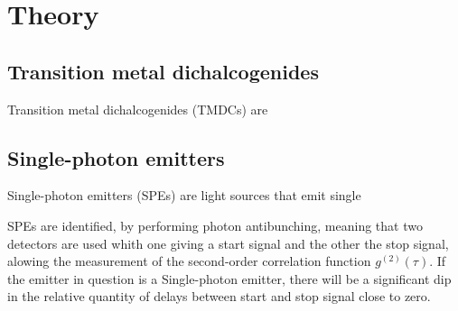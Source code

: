 \section{Theory}
\label{sec:theory}

\subsection{Transition metal dichalcogenides}

Transition metal dichalcogenides (TMDCs) are %

\subsection{Single-photon emitters}
\label{sec:theory:spe}

Single-photon emitters (SPEs) are light sources that emit single

SPEs are identified, by performing photon antibunching, meaning that two detectors are used whith one giving a start signal and the other the stop signal, alowing the measurement of the second-order correlation function $g^{(2)}(\tau)$.
If the emitter in question is a Single-photon emitter, there will be a significant dip in the relative quantity of delays between start and stop signal close to zero.
